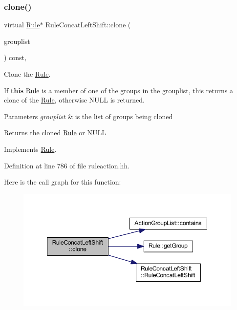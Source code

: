 \subsubsection{\texorpdfstring{clone()}{clone()}}
{\footnotesize\ttfamily virtual \mbox{\hyperlink{class_rule}{Rule}}$\ast$ Rule\+Concat\+Left\+Shift\+::clone (\begin{DoxyParamCaption}\item[{const \mbox{\hyperlink{class_action_group_list}{Action\+Group\+List}} \&}]{grouplist }\end{DoxyParamCaption}) const\hspace{0.3cm}{\ttfamily [inline]}, {\ttfamily [virtual]}}



Clone the \mbox{\hyperlink{class_rule}{Rule}}. 

If {\bfseries{this}} \mbox{\hyperlink{class_rule}{Rule}} is a member of one of the groups in the grouplist, this returns a clone of the \mbox{\hyperlink{class_rule}{Rule}}, otherwise N\+U\+LL is returned. 
\begin{DoxyParams}{Parameters}
{\em grouplist} & is the list of groups being cloned \\
\hline
\end{DoxyParams}
\begin{DoxyReturn}{Returns}
the cloned \mbox{\hyperlink{class_rule}{Rule}} or N\+U\+LL 
\end{DoxyReturn}


Implements \mbox{\hyperlink{class_rule_a70de90a76461bfa7ea0b575ce3c11e4d}{Rule}}.



Definition at line 786 of file ruleaction.\+hh.

Here is the call graph for this function\+:
\nopagebreak
\begin{figure}[H]
\begin{center}
\leavevmode
\includegraphics[width=347pt]{class_rule_concat_left_shift_a45bbbdffb4920db4a0bf043cdfd6783c_cgraph}
\end{center}
\end{figure}
\mbox{\label{class_rule_concat_left_shift_a64b4f306e3602adf370a622f7ec90963}} 
